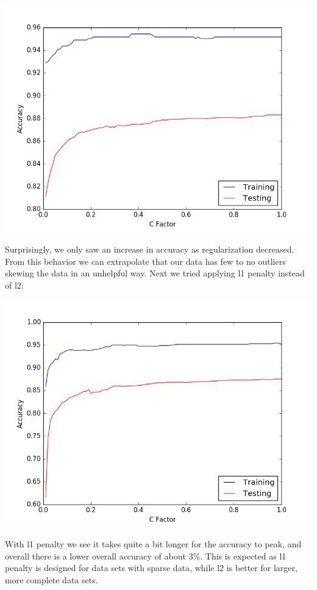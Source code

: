 \documentclass[10pt,letterpaper,onecolumn,draftclsnofoot]{IEEEtran}
\begin{document}
	 \includegraphics[scale=.75]{../logistic/l2_penalty}
	 
	 
	 Surprisingly, we only saw an increase in accuracy as regularization decreased. From
	 this behavior we can extrapolate that our data has few to no outliers skewing the
	 data in an unhelpful way. Next we tried applying l1 penalty instead of l2:
	 
	 
	 \includegraphics[scale=.75]{../logistic/l1_penalty}
	 
	 
	 With l1 penalty we see it takes quite a bit longer for the accuracy to peak, and 
	 overall there is a lower overall accuracy of about 3\%. This is expected as l1 
	 penalty is designed for data sets with sparse data, while l2 is better for larger,
	 more complete data sets.
	 
\end{document}
